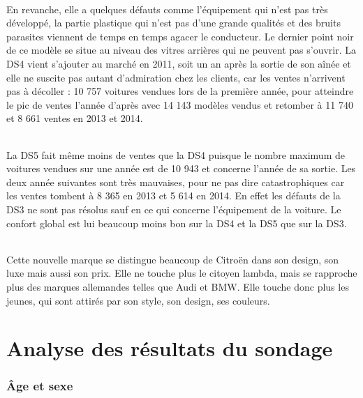 \documentclass[12pt]{article}\usepackage[]{graphicx}\usepackage[]{color}
\begin{document}
\paragraph{} En revanche, elle a quelques défauts comme l'équipement qui n'est
pas très développé, la partie plastique qui n'est pas d'une grande qualités et
des bruits parasites viennent de temps en temps agacer le conducteur. Le
dernier point noir de ce modèle se situe au niveau des vitres arrières qui ne
peuvent pas s'ouvrir. La DS4 vient s'ajouter au marché en 2011, soit un an après
la sortie de son aînée et elle ne suscite pas autant d'admiration chez les
clients, car les ventes n'arrivent pas à décoller : 10 757 voitures vendues lors
de la première année, pour atteindre le pic de ventes l'année d'après avec 14
143 modèles vendus et retomber à 11 740 et 8 661 ventes en 2013 et 2014.

\paragraph{} La DS5 fait même moins de ventes que la DS4 puisque le nombre
maximum de voitures vendues sur une année est de 10 943 et concerne l'année de
sa sortie. Les deux année suivantes sont très mauvaises, pour ne pas dire
catastrophiques car les ventes tombent à 8 365 en 2013 et 5 614 en 2014. En
effet les défauts de la DS3 ne sont pas résolus sauf en ce qui concerne
l'équipement de la voiture. Le confort global est lui beaucoup moins bon sur la
DS4 et la DS5 que sur la DS3.

\paragraph{} Cette nouvelle marque se distingue beaucoup de Citroën dans son
design, son luxe mais aussi son prix. Elle ne touche plus le citoyen lambda,
mais se rapproche plus des marques allemandes telles que Audi et BMW. Elle
touche donc plus les jeunes, qui sont attirés par son style, son design, ses
couleurs.

\break
\part{Analyse des résultats du sondage}

\section{Âge et sexe}
\end{document}
